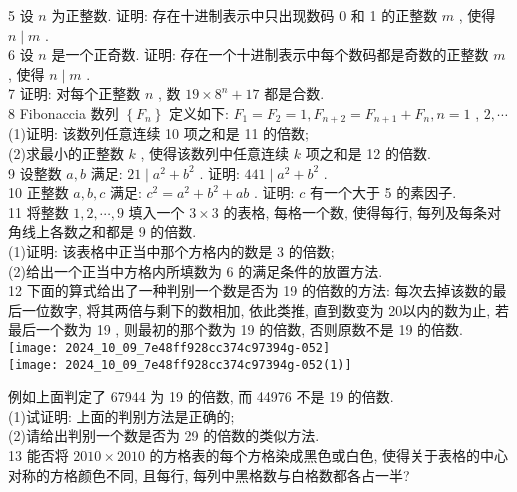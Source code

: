 5 设 $n$ 为正整数. 证明: 存在十进制表示中只出现数码 0 和 1 的正整数 $m$ , 使得 $n \mid m$ . \\
6 设 $n$ 是一个正奇数. 证明: 存在一个十进制表示中每个数码都是奇数的正整数 $m$ , 使得 $n \mid m$ . \\
7 证明: 对每个正整数 $n$ , 数 $19 \times 8^{n}+17$ 都是合数. \\
8 Fibonaccia 数列 $\left\{F_{n}\right\}$ 定义如下: $F_{1}=F_{2}=1, F_{n+2}=F_{n+1}+F_{n}, n=1$ ,  $2, \cdots$\\
(1)证明: 该数列任意连续 10 项之和是 11 的倍数; \\
(2)求最小的正整数 $k$ , 使得该数列中任意连续 $k$ 项之和是 12 的倍数. \\
9 设整数 $a ,  b$ 满足:  $21 \mid a^{2}+b^{2}$ . 证明:  $441 \mid a^{2}+b^{2}$ . \\
10 正整数 $a ,  b ,  c$ 满足:  $c^{2}=a^{2}+b^{2}+a b$ . 证明:  $c$ 有一个大于 5 的素因子. \\
11 将整数 $1,2, \cdots, 9$ 填入一个 $3 \times 3$ 的表格, 每格一个数, 使得每行, 每列及每条对角线上各数之和都是 9 的倍数. \\
(1)证明: 该表格中正当中那个方格内的数是 3 的倍数; \\
(2)给出一个正当中方格内所填数为 6 的满足条件的放置方法.\\
12 下面的算式给出了一种判别一个数是否为 19 的倍数的方法: 每次去掉该数的最后一位数字, 将其两倍与剩下的数相加, 依此类推, 直到数变为 20以内的数为止, 若最后一个数为 19 , 则最初的那个数为 19 的倍数, 否则原数不是 19 的倍数. \\
\texttt{[image: 2024\_10\_09\_7e48ff928cc374c97394g-052]}\\
\texttt{[image: 2024\_10\_09\_7e48ff928cc374c97394g-052(1)]}

例如上面判定了 67944 为 19 的倍数, 而 44976 不是 19 的倍数. \\
(1)试证明: 上面的判别方法是正确的; \\
(2)请给出判别一个数是否为 29 的倍数的类似方法.\\
13 能否将 $2010 \times 2010$ 的方格表的每个方格染成黑色或白色, 使得关于表格的中心对称的方格颜色不同, 且每行, 每列中黑格数与白格数都各占一半?

